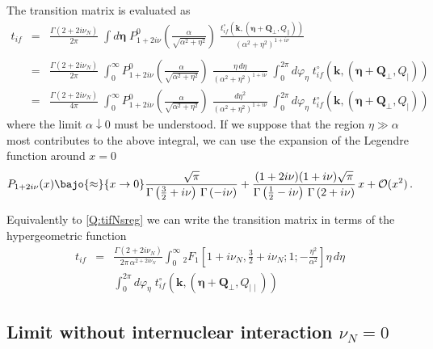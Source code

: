 The transition matrix is evaluated as
\begin{eqnarray}\label{Q:tifNsreg}
t_{if} &=&   \frac{\Gamma \left( 2 + 2 i \nu_{N} \right)}{2 \pi} \; \int
d \bm{\eta} \; P^{0}_{1 + 2 i \nu} \left(
\frac{\alpha}{\sqrt{\alpha^{2}+ \eta^{2}}}\right) \;
\frac{t^{\circ}_{if}(\bm{k},(\bm{\eta}+\bm{Q}_{\perp},Q_{\parallel}))} {
\left( {\alpha^{2} + \eta^{2}} \right)^{1+i \nu}} \nonumber \\ \\
&=&  \frac{\Gamma \left( 2 + 2 i \nu_{N} \right)}{2 \pi} \;
\int_{0}^{\infty} P^{0}_{1 + 2 i \nu} \left(
\frac{\alpha}{\sqrt{\alpha^{2}+ \eta^{2}}} \right) \; \frac{\eta \, d
\eta}{\left( {\alpha^{2} + \eta^{2}} \right)^{1+i \nu}} \;\int_{0}^{2 \pi}
d \varphi_{\eta} \; t^{\circ}_{if}(\bm{k},(\bm{\eta}+\bm{Q}_{\perp},Q_{\mid
}))\nonumber
\\
&=&  \frac{\Gamma \left( 2 + 2 i \nu_{N} \right)}{4 \pi} \;
\int_{0}^{\infty} P^{0}_{1 + 2 i \nu} \left(
\frac{\alpha}{\sqrt{\alpha^{2}+ \eta^{2}}} \right) \; \frac{d \eta^{2}}{
\left( {\alpha^{2} + \eta^{2}} \right)^{1+i \nu}} \;\int_{0}^{2 \pi} d
\varphi_{\eta} \; t^{\circ}_{if}(\bm{k},(\bm{\eta}+\bm{Q}_{\perp},Q_{\mid
}))\nonumber
\end{eqnarray}
%
where the limit $\alpha \downarrow 0$ must be understood. If we suppose that
the region $\eta \gg \alpha $ most contributes to the above integral, we can
use the expansion of the Legendre function around $x=0$
%
\[
P_{1 + 2 i \nu} (x) \bajo{\approx}{x \to 0}
\frac{\sqrt{\pi}}{\Gamma\left(\frac{3}{2} + i \nu \right) \,
\Gamma\left(-i \nu\right)} + \frac{(1 + 2 i \nu) (1 + i \nu)
\sqrt{\pi}}{\Gamma\left(\frac{1}{2} - i \nu \right) \, \Gamma\left(2+ i
\nu \right)}\, x + \mathcal{O}(x^{2}) \, .
\]


Equivalently to \ref{Q:tifNsreg} we can write the transition matrix in terms
of the hypergeometric function
%
\begin{eqnarray}
t_{if} & =&\frac{\Gamma \left( 2 + 2 i \nu_{N} \right)}{2 \pi \, \alpha^{2
 + 2 i \nu_{N}}} \int_{0}^{\infty} {_{2}F_{1}}\left[ 1 + i \nu_{N},
\frac{3}{2} + i \nu_{N} ; 1; -  \frac{\eta^{2}}{\alpha^{2}} \right] \eta
\, d \eta \nonumber \\ &&\int_{0}^{2 \pi} d \varphi_{\eta} \;
t^{\circ}_{if}(\bm{k},(\bm{\eta}+\bm{Q}_{\perp},Q_{\mid  \mid }))
\end{eqnarray}

\subsection*{Limit without internuclear interaction $\nu_{N}=0$}

